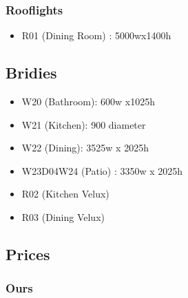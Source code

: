 \subsubsection{Rooflights}
\begin{itemize}
\item R01 (Dining Room) : 5000wx1400h
\end{itemize}    

\subsection {Bridies}
\begin{itemize}
\item W20 (Bathroom): 600w x1025h
\item W21 (Kitchen): 900 diameter
\item W22 (Dining): 3525w x 2025h
\item W23D04W24 (Patio) : 3350w x 2025h
\item R02 (Kitchen Velux)
\item R03 (Dining Velux)
\end{itemize}

\subsection{Prices}
\subsubsection{Ours}

